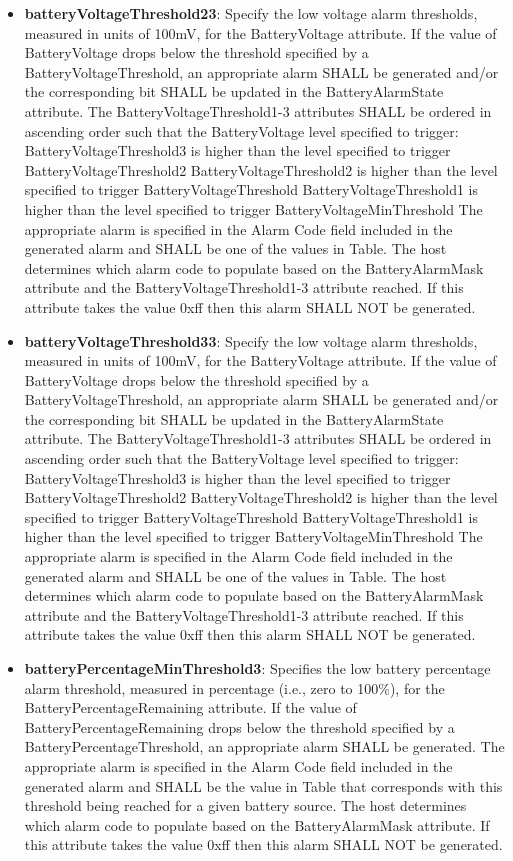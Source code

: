 \begin{itemize}
\item \textbf{batteryVoltageThreshold23}: Specify the low voltage alarm thresholds, measured in units of 100mV, for the BatteryVoltage attribute. If the value of BatteryVoltage drops below the threshold specified by a BatteryVoltageThreshold, an appropriate alarm SHALL be generated and/or the corresponding bit SHALL be updated in the BatteryAlarmState attribute. The BatteryVoltageThreshold1-3 attributes SHALL be ordered in ascending order such that the BatteryVoltage level specified to trigger: BatteryVoltageThreshold3 is higher than the level specified to trigger BatteryVoltageThreshold2 BatteryVoltageThreshold2 is higher than the level specified to trigger BatteryVoltageThreshold BatteryVoltageThreshold1 is higher than the level specified to trigger BatteryVoltageMinThreshold The appropriate alarm is specified in the Alarm Code field included in the generated alarm and SHALL be one of the values in Table. The host determines which alarm code to populate based on the BatteryAlarmMask attribute and the BatteryVoltageThreshold1-3 attribute reached. If this attribute takes the value 0xff then this alarm SHALL NOT be generated.
\item \textbf{batteryVoltageThreshold33}: Specify the low voltage alarm thresholds, measured in units of 100mV, for the BatteryVoltage attribute. If the value of BatteryVoltage drops below the threshold specified by a BatteryVoltageThreshold, an appropriate alarm SHALL be generated and/or the corresponding bit SHALL be updated in the BatteryAlarmState attribute. The BatteryVoltageThreshold1-3 attributes SHALL be ordered in ascending order such that the BatteryVoltage level specified to trigger: BatteryVoltageThreshold3 is higher than the level specified to trigger BatteryVoltageThreshold2 BatteryVoltageThreshold2 is higher than the level specified to trigger BatteryVoltageThreshold BatteryVoltageThreshold1 is higher than the level specified to trigger BatteryVoltageMinThreshold The appropriate alarm is specified in the Alarm Code field included in the generated alarm and SHALL be one of the values in Table. The host determines which alarm code to populate based on the BatteryAlarmMask attribute and the BatteryVoltageThreshold1-3 attribute reached. If this attribute takes the value 0xff then this alarm SHALL NOT be generated.
\item \textbf{batteryPercentageMinThreshold3}: Specifies the low battery percentage alarm threshold, measured in percentage (i.e., zero to 100\%), for the BatteryPercentageRemaining attribute. If the value of BatteryPercentageRemaining drops below the threshold specified by a BatteryPercentageThreshold, an appropriate alarm SHALL be generated. The appropriate alarm is specified in the Alarm Code field included in the generated alarm and SHALL be the value in Table that corresponds with this threshold being reached for a given battery source. The host determines which alarm code to populate based on the BatteryAlarmMask attribute. If this attribute takes the value 0xff then this alarm SHALL NOT be generated.

\end{itemize}
